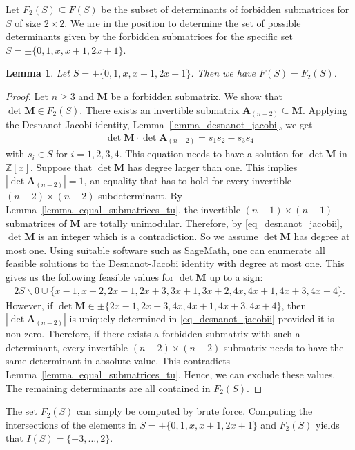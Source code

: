 \documentclass[a4paper, 11pt]{article}
\newcommand{\Z}{\mathbb{Z}}
\newcommand{\bA}{\bm{A}}
\newcommand{\bM}{\bm{M}}
\newcommand{\indet}{x}
\newcommand{\polyring}{\Z[\indet]}
\newcommand{\polyS}{S}
\newcommand{\polyM}{\bM}
\newtheorem{lemma}{Lemma}
\begin{document}
	Let $F_2(\polyS)\subseteq F(\polyS)$ be the subset of determinants of forbidden submatrices for $\polyS$ of size $2\times 2$.  
	We are in the position to determine the set of possible determinants given by the forbidden submatrices for the specific set $\polyS=\pm\lbrace 0,1,\indet,\indet+1,2\indet+1\rbrace$.
	\begin{lemma}{\cite[Lemma~7]{celayakuhlmannweismantel2024matricespolynomial}}
		\label{lemma_determinants_submatrices_1_a_a+1_2a+1}
		Let $\polyS=\pm\lbrace 0,1,\indet,\indet+1,2\indet+1\rbrace$. Then we have $F(\polyS) = F_2(\polyS)$.
	\end{lemma}
	\begin{proof}
		Let $n\geq 3$ and $\polyM$ be a forbidden submatrix. We show that $\det\polyM \in F_2(\polyS)$. There exists an invertible submatrix $\bA_{(n-2)}\subseteq\polyM$. Applying the Desnanot-Jacobi identity, Lemma~\ref{lemma_desnanot_jacobi}, we get
		\begin{align}\label{eq_desnanot_jacobii}
			\det\polyM\cdot\det\bA_{(n-2)} = s_1s_2 - s_3s_4
		\end{align}
		with $s_i\in \polyS$ for $i=1,2,3,4$. This equation needs to have a solution for $\det\polyM$ in $\polyring$. Suppose that $\det\polyM$ has degree larger than one. This implies $\left|\det\bA_{(n-2)}\right| = 1$, an equality that has to hold for every invertible $(n-2)\times (n-2)$ subdeterminant. By Lemma~\ref{lemma_equal_submatrices_tu}, the invertible $(n-1)\times(n-1)$ submatrices of $\polyM$ are totally unimodular. Therefore, by \eqref{eq_desnanot_jacobii}, $\det\polyM$ is an integer which is a contradiction. So we assume $\det\bM$ has degree at most one. Using suitable software such as SageMath, one can enumerate all feasible solutions to the Desnanot-Jacobi identity with degree at most one. This gives us the following feasible values for $\det\polyM$ up to a sign:
		\begin{align*}
			2\polyS\backslash 0 \cup \lbrace \indet-1,\indet+2,2\indet-1,2\indet+3,3\indet+1,3\indet+2,4\indet,4\indet+1,4\indet+3,4\indet+4\rbrace.
		\end{align*}
		However, if $\det\polyM\in\pm\lbrace 2\indet-1,2\indet+3,4\indet,4\indet+1,4\indet+3,4\indet+4\rbrace$, then $\left|\det\bA_{(n-2)}\right|$ is uniquely determined in \eqref{eq_desnanot_jacobii} provided it is non-zero. Therefore, if there exists a forbidden submatrix with such a determinant, every invertible $(n-2)\times (n-2)$ submatrix needs to have the same determinant in absolute value. This contradicts Lemma~\ref{lemma_equal_submatrices_tu}. Hence, we can exclude these values. The remaining determinants are all contained in $F_2(\polyS)$. 
	\end{proof}
	The set $F_2(\polyS)$ can simply be computed by brute force. 
	Computing the intersections of the elements in $\polyS=\pm\lbrace 0,1,\indet,\indet+1,2\indet+1\rbrace$ and $F_2(\polyS)$ yields that $I(\polyS)=\lbrace -3,\ldots,2\rbrace$. 
	
\end{document}
